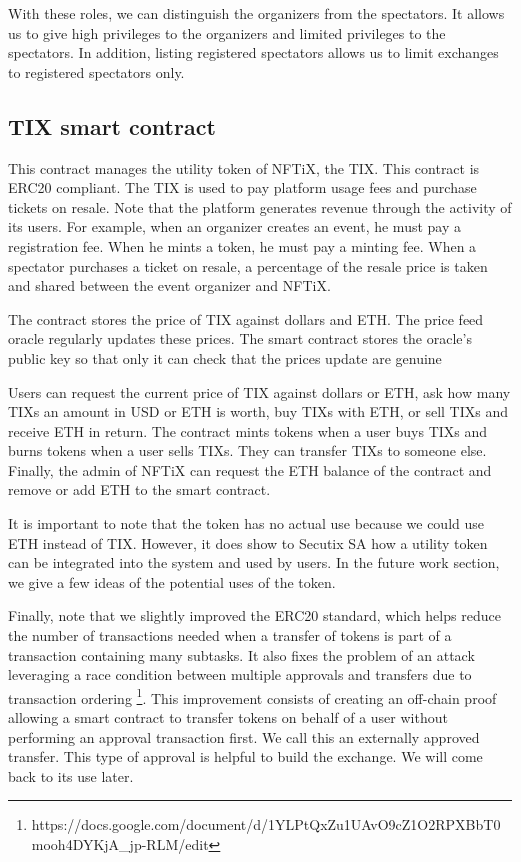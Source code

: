 \documentclass[a4paper,11pt,oneside]{report}
\begin{document}
With these roles, we can distinguish the organizers from the spectators. It allows us to give high privileges to the organizers and limited privileges to the spectators. In addition, listing registered spectators allows us to limit exchanges to registered spectators only.

\subsection{TIX smart contract}
This contract manages the utility token of NFTiX, the TIX. This contract is ERC20 compliant. The TIX is used to pay platform usage fees and purchase tickets on resale. Note that the platform generates revenue through the activity of its users. For example, when an organizer creates an event, he must pay a registration fee. When he mints a token, he must pay a minting fee. When a spectator purchases a ticket on resale, a percentage of the resale price is taken and shared between the event organizer and NFTiX.

The contract stores the price of TIX against dollars and ETH. The price feed oracle regularly updates these prices. The smart contract stores the oracle's public key so that only it can check that the prices update are genuine

Users can request the current price of TIX against dollars or ETH, ask how many TIXs an amount in USD or ETH is worth, buy TIXs with ETH, or sell TIXs and receive ETH in return. The contract mints tokens when a user buys TIXs and burns tokens when a user sells TIXs. They can transfer TIXs to someone else. Finally, the admin of NFTiX can request the ETH balance of the contract and remove or add ETH to the smart contract.

It is important to note that the token has no actual use because we could use ETH instead of TIX. However, it does show to Secutix SA how a utility token can be integrated into the system and used by users. In the future work section, we give a few ideas of the potential uses of the token.

Finally, note that we slightly improved the ERC20 standard, which helps reduce the number of transactions needed when a transfer of tokens is part of a transaction containing many subtasks. It also fixes the problem of an attack leveraging a race condition between multiple approvals and transfers due to transaction ordering \footnote{https://docs.google.com/document/d/1YLPtQxZu1UAvO9cZ1O2RPXBbT0mooh4DYKjA_jp-RLM/edit}. This improvement consists of creating an off-chain proof allowing a smart contract to transfer tokens on behalf of a user without performing an approval transaction first. We call this an externally approved transfer. This type of approval is helpful to build the exchange. We will come back to its use later.
\end{document}
